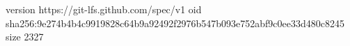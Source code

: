 version https://git-lfs.github.com/spec/v1
oid sha256:9e274b4b4c9919828c64b9a92492f2976b547b093e752abf9c0ee33d480c8245
size 2327
